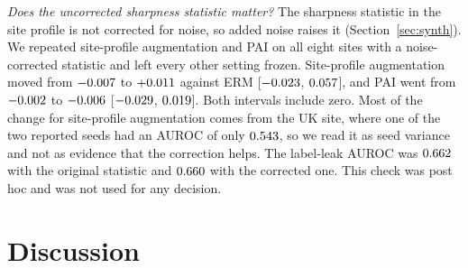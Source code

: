 \documentclass[journal]{IEEEtran}
\newcommand{\erm}{ERM}
\begin{document}
\emph{Does the uncorrected sharpness statistic matter?} The sharpness statistic in the site profile is not corrected for noise, so added noise raises it (Section~\ref{sec:synth}). We repeated site-profile augmentation and PAI on all eight sites with a noise-corrected statistic and left every other setting frozen. Site-profile augmentation moved from $-0.007$ to $+0.011$ against \erm{} [$-0.023$, $0.057$], and PAI went from $-0.002$ to $-0.006$ [$-0.029$, $0.019$]. Both intervals include zero. Most of the change for site-profile augmentation comes from the UK site, where one of the two reported seeds had an AUROC of only $0.543$, so we read it as seed variance and not as evidence that the correction helps. The label-leak AUROC was $0.662$ with the original statistic and $0.660$ with the corrected one. This check was post hoc and was not used for any decision.

\section{Discussion}\label{sec:discussion}
\end{document}
